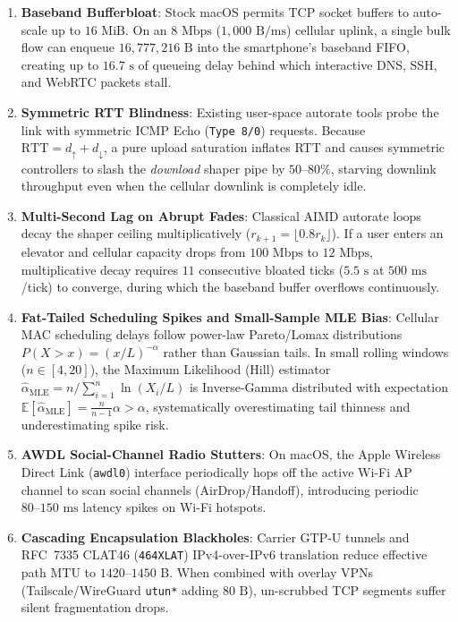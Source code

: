 \documentclass[11pt,a4paper]{article}
\theoremstyle{definition}
\begin{document}
\begin{enumerate}[leftmargin=2em]
  \item \textbf{Baseband Bufferbloat}: Stock macOS permits TCP socket buffers to auto-scale up to $16\text{ MiB}$. On an $8\text{ Mbps}$ ($1,000\text{ B/ms}$) cellular uplink, a single bulk flow can enqueue $16,777,216\text{ B}$ into the smartphone's baseband FIFO, creating up to $16.7\text{ s}$ of queueing delay behind which interactive DNS, SSH, and WebRTC packets stall.
  \item \textbf{Symmetric RTT Blindness}: Existing user-space autorate tools probe the link with symmetric ICMP Echo (\texttt{Type 8/0}) requests. Because $\mathrm{RTT} = d_\uparrow + d_\downarrow$, a pure upload saturation inflates RTT and causes symmetric controllers to slash the \emph{download} shaper pipe by $50\text{--}80\%$, starving downlink throughput even when the cellular downlink is completely idle.
  \item \textbf{Multi-Second Lag on Abrupt Fades}: Classical AIMD autorate loops decay the shaper ceiling multiplicatively ($r_{k+1} = \lfloor 0.8 r_k \rfloor$). If a user enters an elevator and cellular capacity drops from $100\text{ Mbps}$ to $12\text{ Mbps}$, multiplicative decay requires $11$ consecutive bloated ticks ($5.5\text{ s}$ at $500\text{ ms}$/tick) to converge, during which the baseband buffer overflows continuously.
  \item \textbf{Fat-Tailed Scheduling Spikes and Small-Sample MLE Bias}: Cellular MAC scheduling delays follow power-law Pareto/Lomax distributions $P(X > x) = (x/L)^{-\alpha}$ rather than Gaussian tails. In small rolling windows ($n \in [4, 20]$), the Maximum Likelihood (Hill) estimator $\widehat{\alpha}_{\mathrm{MLE}} = n / \sum_{i=1}^n \ln(X_i / L)$ is Inverse-Gamma distributed with expectation $\mathbb{E}[\widehat{\alpha}_{\mathrm{MLE}}] = \frac{n}{n-1}\alpha > \alpha$, systematically overestimating tail thinness and underestimating spike risk.
  \item \textbf{AWDL Social-Channel Radio Stutters}: On macOS, the Apple Wireless Direct Link (\texttt{awdl0}) interface periodically hops off the active Wi-Fi AP channel to scan social channels (AirDrop/Handoff), introducing periodic $80\text{--}150\text{ ms}$ latency spikes on Wi-Fi hotspots.
  \item \textbf{Cascading Encapsulation Blackholes}: Carrier GTP-U tunnels and RFC~7335 CLAT46 (\texttt{464XLAT}) IPv4-over-IPv6 translation reduce effective path MTU to $1420\text{--}1450\text{ B}$. When combined with overlay VPNs (Tailscale/WireGuard \texttt{utun*} adding $80\text{ B}$), un-scrubbed TCP segments suffer silent fragmentation drops.
\end{enumerate}
\end{document}
